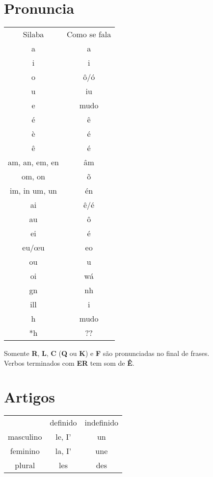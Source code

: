\section{Pronuncia}
\begin{tabular}{cc}
Silaba& Como se fala\\
	a&a\\
	i&i\\
	o&ô/ó\\
	u&iu\\
	e&mudo\\
	é&ê\\
	è&é\\
	ê&é\\
	am, an, em, en&âm\\
	om, on&õ\\
	im, in um, un&én\\
	ai&ê/é\\
	au&ô\\
	ei&é\\
	eu/\oe u&eo\\
	ou&u\\
	oi&wá\\
	gn&nh\\
	ill&i\\
	h& mudo\\
	*h&??\\	
	\end{tabular}
Somente \textbf{R}, \textbf{L}, \textbf{C} (\textbf{Q} ou \textbf{K}) e \textbf{F} são pronunciadas no final de frases.\\
Verbos terminados com \textbf{ER} tem som de \textbf{Ê}.
\section{Artigos}
\begin{tabular}{ccc}
	&definido&indefinido\\
	masculino&le, I'&un\\
	feminino&la, I'&une\\
	plural&les&des\\
\end{tabular}
